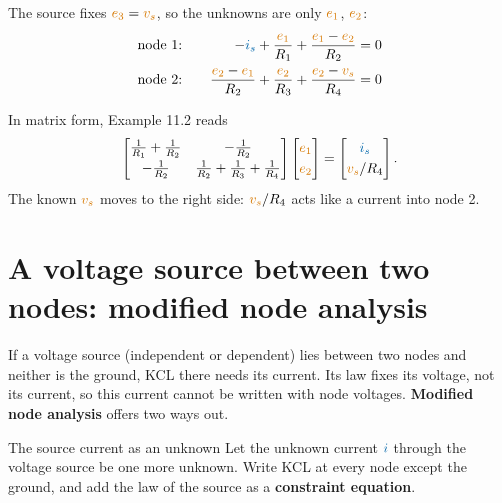 \documentclass[11pt,a4paper]{article}
\newcommand{\Icol}[1]{\textcolor{ccur}{#1}}
\newcommand{\Vcol}[1]{\textcolor{cvolt}{#1}}
\newcommand{\e}[1]{\textcolor{cvolt}{e_{#1}}}
\newcommand{\nodev}[3]{\fill (#1) circle (1.7pt) node[#2, inner sep=2pt, font=\small, text=cvolt] {#3};}
\newcommand{\gnd}[1]{\draw (#1,0) -- (#1,-0.2) node[ground] {};}
\newcommand{\nodeA}[3]{\ifnum\exAst>1 \nodev{#1}{#2}{#3}\else\fill (#1) circle (1.7pt);\fi}
\newcommand{\exA}[1]{%
  \ifnum#1=0
    \draw (0,0) to[american current source, l=$\Icol{i_{s1}}$] (0,2);
  \else
    \draw (0,0) to[american current source, l=$\Icol{i_s}$] (0,2);
  \fi
  \draw (0,2) -- (1.8,2) to[R, l=$R_2$] (3.8,2) to[R, l_=$R_4$] (5.8,2);
  \draw (1.8,2) to[R, l_=$R_1$] (1.8,0);
  \draw (3.8,2) to[R, l_=$R_3$] (3.8,0);
  \draw (0,0) -- (5.8,0);
  \ifnum#1=0
    \draw (1.8,2) -- (1.8,3.0) to[R, l=$R_5$] (5.8,3.0) -- (5.8,2);
    \draw (5.8,2) to[american current source, l=$\Icol{i_{s2}}$] (5.8,0);
    \nodeA{3.8,2}{above}{$e_2$}
    \nodeA{5.8,2}{above right}{$e_3$}
    \nodeA{1.8,2}{above left}{$e_1$}
  \else
    \draw (5.8,0) to[american voltage source, invert, l_=$\Vcol{v_s}$] (5.8,2);
    \nodev{3.8,2}{above}{$e_2$}
    \ifnum#1=1 \nodev{5.8,2}{above}{$e_3$}\else \fill (5.8,2) circle (1.7pt);\fi
  \fi
  \ifnum#1=0\else\nodeA{1.8,2}{above}{$e_1$}\fi
  \ifnum\exAst>0 \gnd{3.8}\fi}
\begin{document}
\begin{examplebox}
\begin{minipage}[c]{0.45\linewidth}
\centering
{}
\end{minipage}\hfill
\begin{minipage}[c]{0.52\linewidth}
The source fixes $\e{3} = \Vcol{v_s}$, so the unknowns are only $\e{1}$, $\e{2}$:
\begin{alignat*}{2}
  &\text{node 1:}\quad & -\Icol{i_s} + \frac{\e{1}}{R_1} + \frac{\e{1} - \e{2}}{R_2} &= 0\\
  &\text{node 2:}\quad & \frac{\e{2} - \e{1}}{R_2} + \frac{\e{2}}{R_3} + \frac{\e{2} - \Vcol{v_s}}{R_4} &= 0
\end{alignat*}
\end{minipage}
\end{examplebox}

In matrix form, Example 11.2 reads
\[
  \begin{bmatrix}
    \frac{1}{R_1} + \frac{1}{R_2} & -\frac{1}{R_2}\\[3pt]
    -\frac{1}{R_2} & \frac{1}{R_2} + \frac{1}{R_3} + \frac{1}{R_4}
  \end{bmatrix}
  \begin{bmatrix} \e{1}\\[3pt] \e{2} \end{bmatrix}
  =
  \begin{bmatrix} \Icol{i_s}\\[3pt] \Vcol{v_s}/R_4 \end{bmatrix} .
\]
The known $\Vcol{v_s}$ moves to the right side: $\Vcol{v_s}/R_4$ acts like a current into node 2.

\section{A voltage source between two nodes: modified node analysis}

If a voltage source (independent or dependent) lies between two nodes and neither is the
ground, KCL there needs its current. Its law fixes its voltage, not its current, so this
current cannot be written with node voltages. \textbf{Modified node analysis} offers two ways out.

\begin{definitionbox}{The source current as an unknown}
Let the unknown current $\Icol{i}$ through the voltage source be one more unknown. Write KCL at
every node except the ground, and add the law of the source as a \textbf{constraint equation}.
\end{definitionbox}
\end{document}
